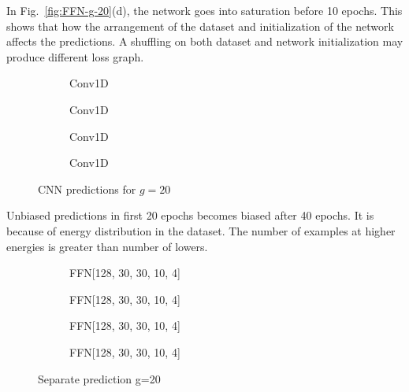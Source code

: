 \documentclass[a4paper,times,12pt]{article}
\begin{document}
In Fig.~\ref{fig:FFN-g-20}(d), the network goes into saturation before 10 epochs. This shows that how the arrangement of the dataset and initialization of the network affects the predictions. A shuffling  on both dataset and network initialization may produce different loss graph. 

\begin{figure}[H]
    \centering
    \begin{subfigure}[t]{0.45\textwidth}
		\centering
        
        \caption{Conv1D}
		\label{fig:a}
    \end{subfigure}
    \begin{subfigure}[t]{0.45\textwidth}
		\centering
        
        \caption{Conv1D}
		\label{fig:b}
    \end{subfigure}    
    \begin{subfigure}[t]{0.45\textwidth}
        \centering
        
        \caption{Conv1D}
		\label{fig:c}
    \end{subfigure}
    \begin{subfigure}[t]{0.45\textwidth}
        \centering
        
        \caption{Conv1D}
		\label{fig:d}
    \end{subfigure}
	\caption{CNN predictions for $g = 20$}
\label{fig:CNN-g-20}
\end{figure}

Unbiased predictions in first 20 epochs becomes biased after 40 epochs. It is because of energy distribution in the dataset. The number of examples at higher energies is greater than number of lowers. 

\begin{figure}[H]
    \centering
    \begin{subfigure}[t]{0.45\textwidth}
		\centering
        
        \caption{FFN[128, 30, 30, 10, 4]}
		\label{fig:a}
    \end{subfigure}
    \begin{subfigure}[t]{0.45\textwidth}
		\centering
        
        \caption{FFN[128, 30, 30, 10, 4]}
		\label{fig:b}
    \end{subfigure}    
    \begin{subfigure}[t]{0.45\textwidth}
        \centering
        
        \caption{FFN[128, 30, 30, 10, 4]}
		\label{fig:c}
    \end{subfigure}
    \begin{subfigure}[t]{0.45\textwidth}
        \centering
        
        \caption{FFN[128, 30, 30, 10, 4]}
		\label{fig:c}
    \end{subfigure}
	\caption{Separate prediction  g=20}
\label{fig:FFN-g-20-S}
\end{figure}
\end{document}
